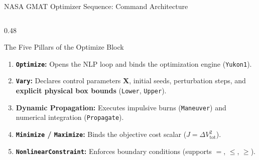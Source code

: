 \documentclass[aspectratio=169, 10pt]{beamer}
\begin{document}
\begin{frame}{NASA GMAT Optimizer Sequence: Command Architecture}
    \begin{columns}[t]
        \begin{column}{0.48\textwidth}
            \begin{block}{The Five Pillars of the Optimize Block}
                \scriptsize
                \begin{enumerate}\setlength{\itemsep}{2pt}\setlength{\topsep}{1pt}
                    \item \textbf{\texttt{Optimize}:} Opens the NLP loop and binds the optimization engine (\texttt{Yukon1}).
                    \item \textbf{\texttt{Vary}:} Declares control parameters $\mathbf{X}$, initial seeds, perturbation steps, and \textbf{explicit physical box bounds} (\texttt{Lower}, \texttt{Upper}).
                    \item \textbf{Dynamic Propagation:} Executes impulsive burns (\texttt{Maneuver}) and numerical integration (\texttt{Propagate}).
                    \item \textbf{\texttt{Minimize} / \texttt{Maximize}:} Binds the objective cost scalar ($J = \Delta V_{\text{tot}}^2$).
                    \item \textbf{\texttt{NonlinearConstraint}:} Enforces boundary conditions (supports $=$, $\le$, $\ge$).
                \end{enumerate}
            \end{block}
        \end{column}


\end{columns}
\end{frame}
\end{document}
